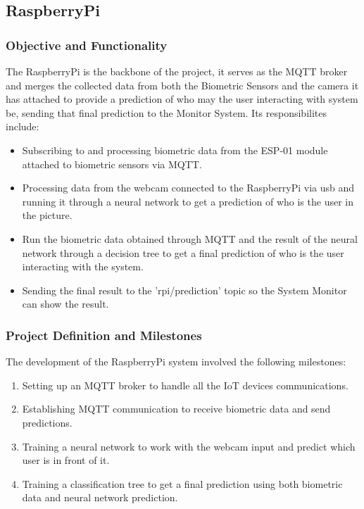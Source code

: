\documentclass{article}
\begin{document}
\subsection{RaspberryPi}

\subsubsection{Objective and Functionality}
The RaspberryPi is the backbone of the project, it serves as the MQTT broker and merges the collected data from both the Biometric Sensors and the camera it has attached to provide a prediction of who may the user interacting with system be, sending that final prediction to the Monitor System. Its responsibilites include:
\begin{itemize}
    \item Subscribing to and processing biometric data from the ESP-01 module attached to biometric sensors via MQTT.
    \item Processing data from the webcam connected to the RaspberryPi via usb and running it through a neural network to get a prediction of who is the user in the picture.
    \item Run the biometric data obtained through MQTT and the result of the neural network through a decision tree to get a final prediction of who is the user interacting with the system.
    \item Sending the final result to the 'rpi/prediction' topic so the System Monitor can show the result.
\end{itemize}

\subsubsection{Project Definition and Milestones}
The development of the RaspberryPi system involved the following milestones:
\begin{enumerate}
    \item Setting up an MQTT broker to handle all the IoT devices communications.
    \item Establishing MQTT communication to receive biometric data and send predictions.
    \item Training a neural network to work with the webcam input and predict which user is in front of it.
    \item Training a classification tree to get a final prediction using both biometric data and neural network prediction.
\end{enumerate}
\end{document}
